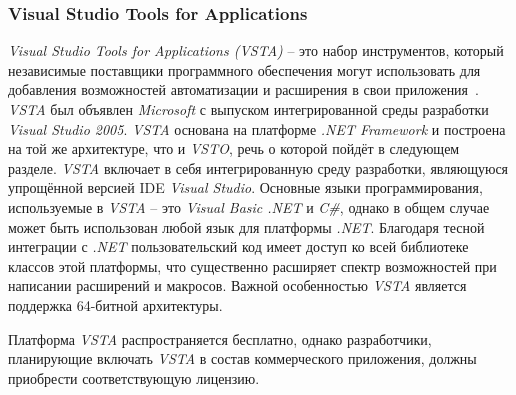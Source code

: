 \subsubsection{Visual Studio Tools for Applications}

{\it Visual Studio Tools for Applications (VSTA)} -- это набор инструментов, который независимые поставщики программного обеспечения могут использовать для добавления возможностей автоматизации и расширения в свои приложения~\cite{vsta-website}. {\it VSTA} был объявлен {\it Microsoft} с выпуском интегрированной среды разработки {\it Visual Studio 2005}. {\it VSTA} основана на платформе {\it .NET Framework} и построена на той же архитектуре, что и {\it VSTO}, речь о которой пойдёт в следующем разделе. {\it VSTA} включает в себя интегрированную среду разработки, являющуюся упрощённой версией IDE {\it Visual Studio}. Основные языки программирования, используемые в {\it VSTA} -- это {\it Visual Basic .NET} и {\it C\#}, однако в общем случае может быть использован любой язык для платформы {\it .NET}. Благодаря тесной интеграции с {\it .NET} пользовательский код имеет доступ ко всей библиотеке классов этой платформы, что существенно расширяет спектр возможностей при написании расширений и макросов. Важной особенностью {\it VSTA} является поддержка 64-битной архитектуры. 

Платформа {\it VSTA} распространяется бесплатно, однако разработчики, планирующие включать {\it VSTA} в состав коммерческого приложения, должны приобрести соответствующую лицензию.